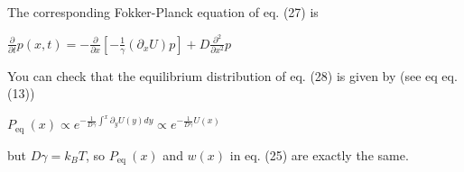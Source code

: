 The corresponding Fokker-Planck equation of eq. (27) is
\begin{DispWithArrows}[displaystyle, format=c]
  $\frac{\partial}{\partial t} p(x, t)=-\frac{\partial}{\partial x}\left[-\frac{1}{\gamma}\left(\partial_{x} U\right) p\right]+D \frac{\partial^{2}}{\partial x^{2}} p$
\end{DispWithArrows}
You can check that the equilibrium distribution of eq. (28) is given by (see
eq eq. (13))
\begin{DispWithArrows}[displaystyle, format=c]
  $P_{\text {eq }}(x) \propto e^{-\frac{1}{D \gamma} \int^{x} \partial_{y} U(y) d y} \propto e^{-\frac{1}{D \gamma} U(x)}$
\end{DispWithArrows}
but $D \gamma=k_{B} T$, so $P_{\text {eq }}(x)$ and $w(x)$ in eq. (25) are
exactly the same.


